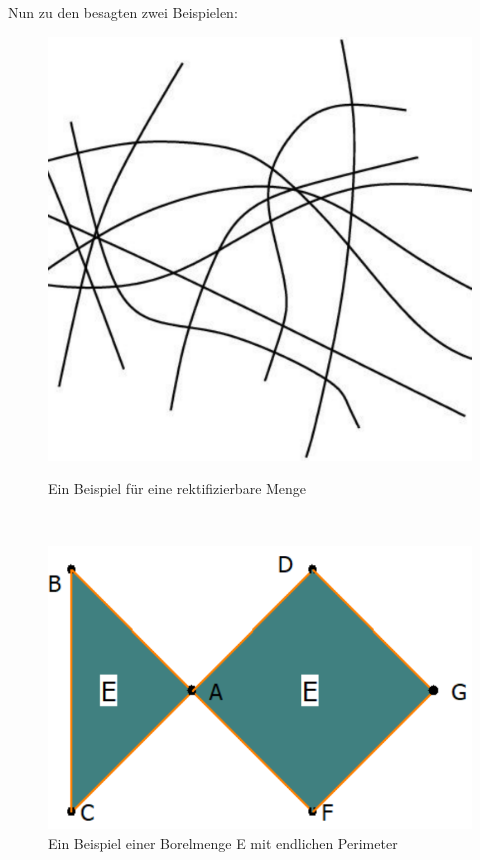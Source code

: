 \newpage
Nun zu den besagten zwei Beispielen:
\begin{figure}
\centering
\begin{minipage}{.35\textwidth}
  \centering
  \includegraphics[width=1.0\linewidth]{figures/RectSet.pdf}
  \caption*{Ein Beispiel für eine rektifizierbare Menge \cite{RectCurve}}
  \label{fig:RectCurve}
\end{minipage}%
\(\, \,\)
\begin{minipage}{.35\textwidth}
  \centering
  \includegraphics[width=1.5\linewidth]{figures/DeGiorgiRand.pdf} 
  \caption*{Ein Beispiel einer Borelmenge E mit endlichen Perimeter}
  \label{fig:deGiorgiRand}
\end{minipage}%
\end{figure}

